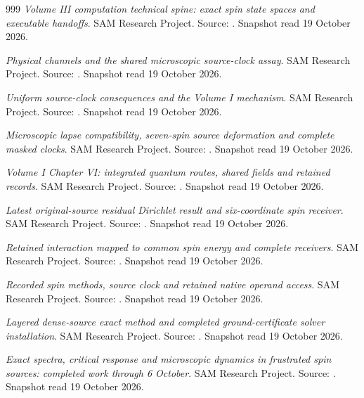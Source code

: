 \begin{thebibliography}{999}
 \emph{Volume III computation technical spine: exact spin state spaces and executable handoffs}. SAM Research Project. Source: . Snapshot read 19 October 2026.

 \emph{Physical channels and the shared microscopic source-clock assay}. SAM Research Project. Source: . Snapshot read 19 October 2026.

 \emph{Uniform source-clock consequences and the Volume I mechanism}. SAM Research Project. Source: . Snapshot read 19 October 2026.

 \emph{Microscopic lapse compatibility, seven-spin source deformation and complete masked clocks}. SAM Research Project. Source: . Snapshot read 19 October 2026.

 \emph{Volume I Chapter VI: integrated quantum routes, shared fields and retained records}. SAM Research Project. Source: . Snapshot read 19 October 2026.

 \emph{Latest original-source residual Dirichlet result and six-coordinate spin receiver}. SAM Research Project. Source: . Snapshot read 19 October 2026.

 \emph{Retained interaction mapped to common spin energy and complete receivers}. SAM Research Project. Source: . Snapshot read 19 October 2026.

 \emph{Recorded spin methods, source clock and retained native operand access}. SAM Research Project. Source: . Snapshot read 19 October 2026.

 \emph{Layered dense-source exact method and completed ground-certificate solver installation}. SAM Research Project. Source: . Snapshot read 19 October 2026.

 \emph{Exact spectra, critical response and microscopic dynamics in frustrated spin sources: completed work through 6 October}. SAM Research Project. Source: . Snapshot read 19 October 2026.


\end{thebibliography}
